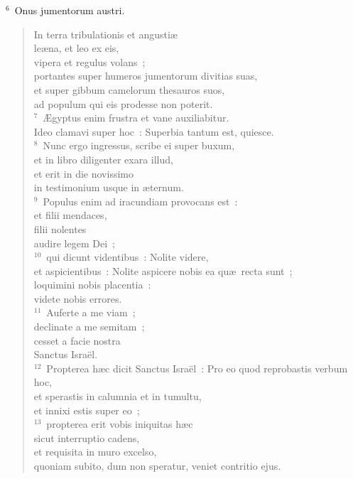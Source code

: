 ${}^{6}$~Onus jumentorum austri. \begin{flushleft}\begin{verse}In terra tribulationis et angusti\ae \\ le\ae na, et leo ex eis,\\ vipera et regulus volans~;\\ portantes super humeros jumentorum divitias suas,\\ et super gibbum camelorum thesauros suos,\\ ad populum qui eis prodesse non poterit.\\
${}^{7}$~\AE gyptus enim frustra et vane auxiliabitur.\\ Ideo clamavi super hoc~: Superbia tantum est, quiesce.\\
${}^{8}$~Nunc ergo ingressus, scribe ei super buxum,\\ et in libro diligenter exara illud,\\ et erit in die novissimo\\ in testimonium usque in \ae ternum.\\
${}^{9}$~Populus enim ad iracundiam provocans est~:\\ et filii mendaces,\\ filii nolentes\\ audire legem Dei~;\\
${}^{10}$~qui dicunt videntibus~: Nolite videre,\\ et aspicientibus~: Nolite aspicere nobis ea qu\ae\ recta sunt~;\\ loquimini nobis placentia~:\\ videte nobis errores.\\
${}^{11}$~Auferte a me viam~;\\ declinate a me semitam~;\\ cesset a facie nostra\\ Sanctus Isra\"el.\\
${}^{12}$~Propterea h\ae c dicit Sanctus Isra\"el~: Pro eo quod reprobastis verbum hoc,\\ et sperastis in calumnia et in tumultu,\\ et innixi estis super eo~;\\
${}^{13}$~propterea erit vobis iniquitas h\ae c\\ sicut interruptio cadens,\\ et requisita in muro excelso,\\ quoniam subito, dum non speratur, veniet contritio ejus.\\

\end{verse}
\end{flushleft}
